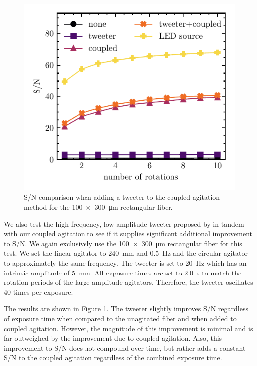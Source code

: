 \begin{figure}
\centering
	\includegraphics[width=\columnwidth]{figures-2/tweeter_snr.pdf}
	\caption{S/N comparison when adding a tweeter to the coupled agitation method for the \SI{100x300}{\micro\meter} rectangular fiber.}
\label{fig:tweeter_snr}
\end{figure}

We also test the high-frequency, low-amplitude tweeter proposed by \citet{plavchan_precision_2013} in tandem with our coupled agitation to see if it supplies significant additional improvement to S/N. We again exclusively use the \SI{100x300}{\micro\meter} rectangular fiber for this test. We set the linear agitator to \SI{240}{\milli\meter} and \SI{0.5}{\hertz} and the circular agitator to approximately the same frequency. The tweeter is set to \SI{20}{\hertz} which has an intrinsic amplitude of \SI{5}{\milli\meter}. All exposure times are set to \SI{2.0}{\second} to match the rotation periods of the large-amplitude agitators. Therefore, the tweeter oscillates 40 times per exposure.

The results are shown in Figure \ref{fig:tweeter_snr}. The tweeter slightly improves S/N regardless of exposure time when compared to the unagitated fiber and when added to coupled agitation. However, the magnitude of this improvement is minimal and is far outweighed by the improvement due to coupled agitation. Also, this improvement to S/N does not compound over time, but rather adds a constant S/N to the coupled agitation regardless of the combined exposure time.

